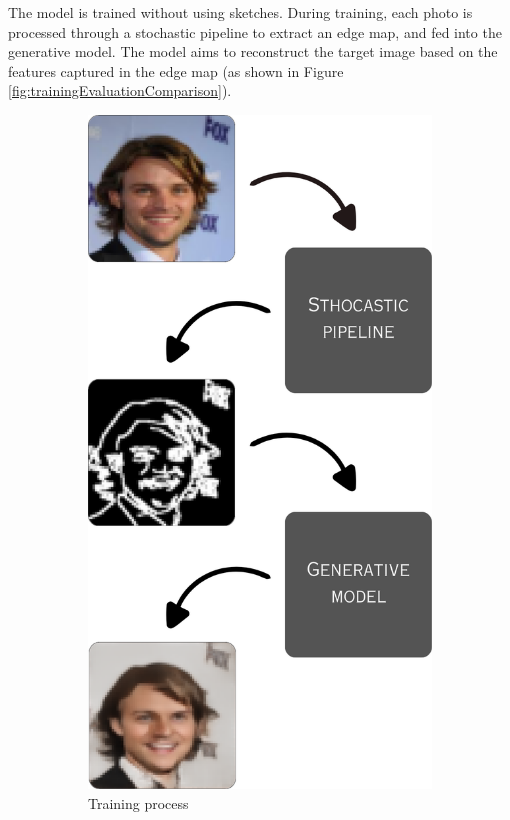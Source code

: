 \documentclass{IEEEcsmag}
\begin{document}
The model is trained without using sketches. During training, each photo is processed through a stochastic pipeline to extract an edge map, and fed into the generative model. The model aims to reconstruct the target image based on the features captured in the edge map (as shown in Figure \ref{fig:trainingEvaluationComparison}).

\begin{figure}[ht]
    \centering
    \begin{subfigure}{0.36\textwidth}
        \centering
        \includegraphics[width=0.72\linewidth]{example image/trainingFramework.png}
        \caption{Training process}
        \label{fig:trainingProcess}
    \end{subfigure}
    \hfill
    \begin{subfigure}{0.36\textwidth}
        \centering

\end{subfigure}
\end{figure}
\end{document}
